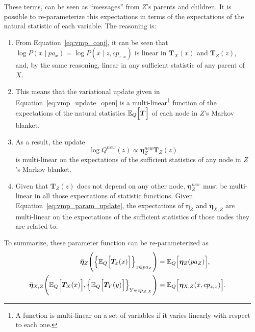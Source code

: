  These terms, can be seen as ``messages'' from \(Z\)'s parents and children. It is possible to re-parameterize this expectations in terms of the expectations of the natural statistic of each variable. The reasoning is:
 \begin{enumerate}
   \item From Equation~\ref{eq:vmp_conj}, it can be seen that \( \log P(x \mid pa_{x}) = \log P(x \mid z , cp_{z,x}) \) is linear in \( \bm{T}_X(x) \) and \( \bm{T}_Z(z) \), and, by the same reasoning, linear in any sufficient statistic of any parent of \( X \).
   \item This means that the variational update given in Equation~\ref{eq:vmp_update_open} is a multi-linear\footnote{A function is multi-linear on a set of variables if it varies linearly with respect to each one.} function of the expectations of the natural statistics \(\mathbb{E}_{Q}\Big[\bm{T}\Big]\) of each node in \(Z\)'s Markov blanket.
   \item As a result, the update
     \[
     \log Q^{new}(z) \propto \bm{\eta}^{new}_{Z} \bm{T}_{Z}(z)
     \]
     is multi-linear on the expectations of the sufficient statistics of any node in \(Z\)'s Markov blanket.
   \item Given that \(\bm{T}_{Z}(z)\) does not depend on any other node, \(\bm{\eta}^{new}_{Z}\) must be multi-linear in all those expectations of statistic functions. Given Equation~\ref{eq:vmp_param_update}, the expectations of \( \bm{\eta}_Z \) and \( \bm{\eta}_{X, Z} \) are multi-linear on the expectations of the sufficient statistics of those nodes they are related to.
 \end{enumerate}
To summarize, these parameter function can be re-parameterized as
\[
  \begin{aligned}
    \bar{\bm{\eta}}_Z \Bigg(\Big\{ \mathbb{E}_{Q}\Big[\bm{T}_{x}(x)\Big] \Big\}_{x \in pa_Z} \Bigg) &= \mathbb{E}_{Q}\Big[\bm{\eta}_Z(pa_Z)\Big],\\
    \bar{\bm{\eta}}_{X,Z} \Bigg(  \mathbb{E}_{Q}\Big[\bm{T}_{X}(x)\Big], \Big\{ \mathbb{E}_{Q}\Big[\bm{T}_{Y}(y)\Big] \Big\}_{Y \in cp_{Z,X}}\Bigg) &= \mathbb{E}_{Q}\Big[\bm{\eta}_{X, Z}(x, cp_{z,x})\Big].\\
  \end{aligned}
\]

